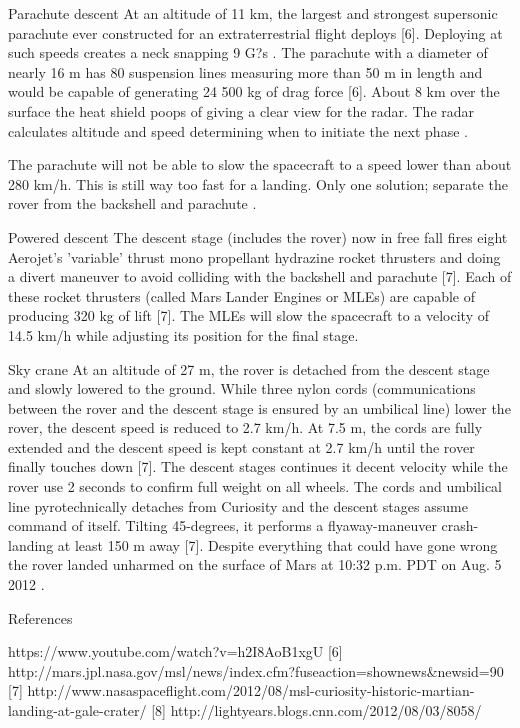Parachute descent
At an altitude of 11 km, the largest and strongest supersonic parachute ever constructed for an extraterrestrial flight deploys \cite{NASALanding} [6].
Deploying at such speeds creates a neck snapping 9 G?s \cite{NASA_youtube}.
The parachute with a diameter of nearly 16 m has 80 suspension lines measuring more than 50 m in length and would be capable of generating 24 500 kg of drag force [6].
About 8 km over the surface the heat shield poops of giving a clear view for the radar.
The radar calculates altitude and speed determining when to initiate the next phase \cite{NASALanding}.

The parachute will not be able to slow the spacecraft to a speed lower than about 280 km/h.
This is still way too fast for a landing. Only one solution; separate the rover from the backshell and parachute \cite{NASALanding}.

Powered descent
The descent stage (includes the rover) now in free fall fires eight Aerojet's 'variable' thrust mono propellant hydrazine rocket thrusters and doing a divert maneuver to avoid colliding with the backshell and parachute \cite{NASALanding} [7]. Each of these rocket thrusters (called Mars Lander Engines or MLEs) are capable of producing 320 kg of lift [7]. The MLEs will slow the spacecraft to a velocity of 14.5 km/h while adjusting its position for the final stage. 

Sky crane
At an altitude of 27 m, the rover is detached from the descent stage and slowly lowered to the ground. While three nylon cords (communications between the rover and the descent stage is ensured by an umbilical line) lower the rover, the descent speed is reduced to 2.7 km/h. At 7.5 m, the cords are fully extended and the descent speed is kept constant at 2.7 km/h until the rover finally touches down \cite{NASALanding} [7]. The descent stages continues it decent velocity while the rover use 2 seconds to confirm full weight on all wheels. The cords and umbilical line pyrotechnically detaches from Curiosity and the descent stages assume command of itself. Tilting 45-degrees, it performs a flyaway-maneuver crash-landing at least 150 m away [7]. 
Despite everything that could have gone wrong the rover landed unharmed on the surface of Mars at 10:32 p.m. PDT on Aug. 5 2012 \cite{NASALanding}.


References

\cite{NASA_youtube}	https://www.youtube.com/watch?v=h2I8AoB1xgU
[6]	http://mars.jpl.nasa.gov/msl/news/index.cfm?fuseaction=shownews\&newsid=90
[7]	http://www.nasaspaceflight.com/2012/08/msl-curiosity-historic-martian-landing-at-gale-crater/
[8]	http://lightyears.blogs.cnn.com/2012/08/03/8058/